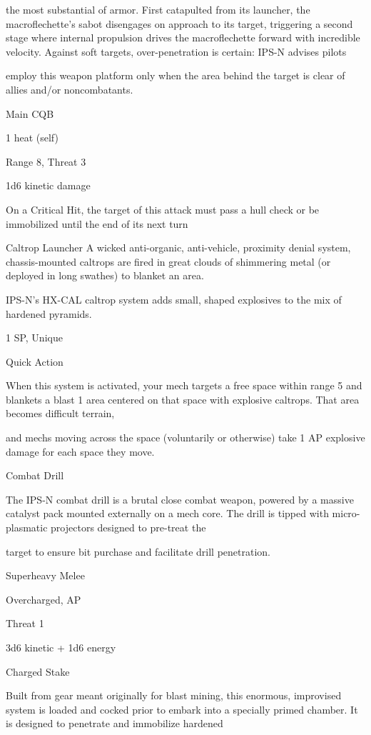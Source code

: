 the most substantial of armor. First catapulted from its launcher, the macroflechette’s sabot disengages on
approach to its target, triggering a second stage where internal propulsion drives the macroflechette
forward with incredible velocity. Against soft targets, over-penetration is certain: IPS-N advises pilots

employ this weapon platform only when the area behind the target is clear of allies and/or noncombatants.

Main CQB

1 heat (self)

Range 8, Threat 3

1d6 kinetic damage

On a Critical Hit, the target of this attack must pass a hull check or be immobilized until the end
of its next turn


Caltrop Launcher
A wicked anti-organic, anti-vehicle, proximity denial system, chassis-mounted caltrops are fired in great
clouds of shimmering metal (or deployed in long swathes) to blanket an area.

IPS-N’s HX-CAL caltrop system adds small, shaped explosives to the mix of hardened pyramids.

1 SP, Unique

Quick Action

When this system is activated, your mech targets a free space within range 5 and blankets a
blast 1 area centered on that space with explosive caltrops. That area becomes difficult terrain,




and mechs moving across the space (voluntarily or otherwise) take 1 AP explosive damage for
each space they move.


Combat Drill

The IPS-N combat drill is a brutal close combat weapon, powered by a massive catalyst pack mounted
externally on a mech core. The drill is tipped with micro-plasmatic projectors designed to pre-treat the

target to ensure bit purchase and facilitate drill penetration.

Superheavy Melee

Overcharged, AP

Threat 1

3d6 kinetic + 1d6 energy


Charged Stake


Built from gear meant originally for blast mining, this enormous, improvised system is loaded and cocked
prior to embark into a specially primed chamber. It is designed to penetrate and immobilize hardened

